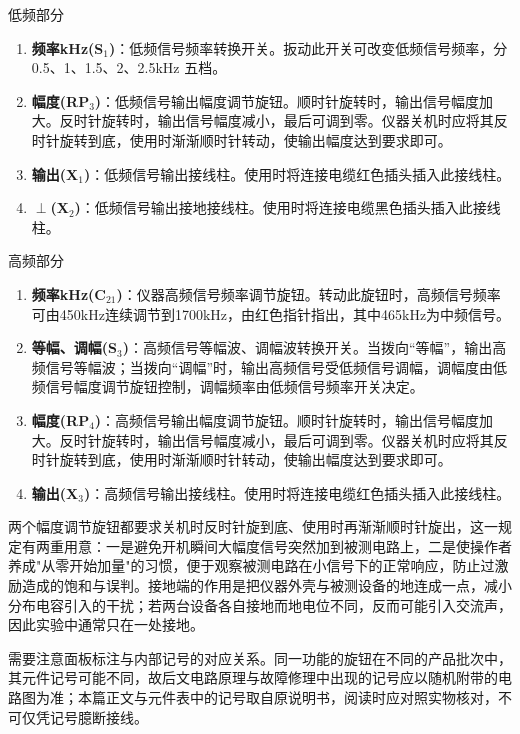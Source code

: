 \documentclass[12pt,UTF8]{ctexbook}
\begin{document}
低频部分

\begin{enumerate}
\item \textbf{频率kHz(S\(_1\))}：低频信号频率转换开关。扳动此开关可改变低频信号频率，分 0.5、1、1.5、2、2.5kHz 五档。
\item \textbf{幅度(RP\(_3\))}：低频信号输出幅度调节旋钮。顺时针旋转时，输出信号幅度加大。反时针旋转时，输出信号幅度减小，最后可调到零。仪器关机时应将其反时针旋转到底，使用时渐渐顺时针转动，使输出幅度达到要求即可。
\item \textbf{输出(X\(_1\))}：低频信号输出接线柱。使用时将连接电缆红色插头插入此接线柱。
\item \textbf{\(\perp\)(X\(_2\))}：低频信号输出接地接线柱。使用时将连接电缆黑色插头插入此接线柱。
\end{enumerate}

高频部分

\begin{enumerate}
\item \textbf{频率kHz(C\(_{21}\))}：仪器高频信号频率调节旋钮。转动此旋钮时，高频信号频率可由450kHz连续调节到1700kHz，由红色指针指出，其中465kHz为中频信号。
\item \textbf{等幅、调幅(S\(_3\))}：高频信号等幅波、调幅波转换开关。当拨向“等幅”，输出高频信号等幅波；当拨向“调幅”时，输出高频信号受低频信号调幅，调幅度由低频信号幅度调节旋钮控制，调幅频率由低频信号频率开关决定。
\item \textbf{幅度(RP\(_4\))}：高频信号输出幅度调节旋钮。顺时针旋转时，输出信号幅度加大。反时针旋转时，输出信号幅度减小，最后可调到零。仪器关机时应将其反时针旋转到底，使用时渐渐顺时针转动，使输出幅度达到要求即可。
\item \textbf{输出(X\(_3\))}：高频信号输出接线柱。使用时将连接电缆红色插头插入此接线柱。
\end{enumerate}

两个幅度调节旋钮都要求关机时反时针旋到底、使用时再渐渐顺时针旋出，这一规定有两重用意：一是避免开机瞬间大幅度信号突然加到被测电路上，二是使操作者养成"从零开始加量"的习惯，便于观察被测电路在小信号下的正常响应，防止过激励造成的饱和与误判。接地端的作用是把仪器外壳与被测设备的地连成一点，减小分布电容引入的干扰；若两台设备各自接地而地电位不同，反而可能引入交流声，因此实验中通常只在一处接地。

需要注意面板标注与内部记号的对应关系。同一功能的旋钮在不同的产品批次中，其元件记号可能不同，故后文电路原理与故障修理中出现的记号应以随机附带的电路图为准；本篇正文与元件表中的记号取自原说明书，阅读时应对照实物核对，不可仅凭记号臆断接线。
\end{document}

